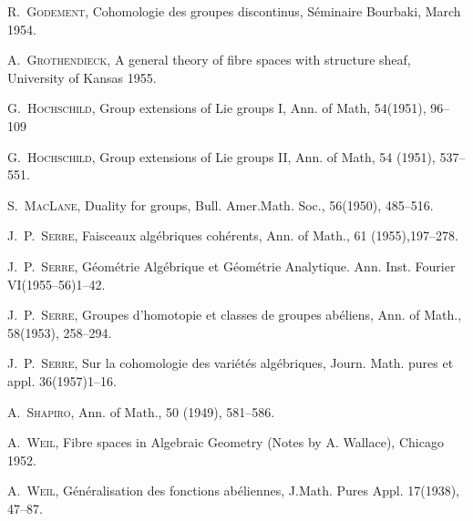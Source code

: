 \begin{list}{}
\item[{[10]}] R.\ \textsc{Godement}, Cohomologie des groupes discontinus,
Séminaire Bourbaki, March 1954.

\item[{[11]}] A.\ \textsc{Grothendieck}, A general theory of fibre spaces
with structure sheaf, University of Kansas 1955.

\item[{[12]}] G.\ \textsc{Hochschild}, Group extensions of Lie groups I,
Ann. of Math, 54(1951), 96--109

\item[{[13]}] G.\ \textsc{Hochschild}, Group extensions of Lie groups II,
Ann. of Math, 54 (1951), 537--551.

\item[{[14]}] S.\ \textsc{MacLane}, Duality for groups,
Bull. Amer.Math. Soc., 56(1950), 485--516.

\item[{[15]}] J.\ P.\ \textsc{Serre}, Faisceaux algébriques cohérents,
Ann. of Math., 61 (1955),197--278.

\item[{[16]}] J.\ P.\ \textsc{Serre}, Géométrie Algébrique et Géométrie
Analytique. Ann. Inst. Fourier VI(1955--56)1--42.

\item[{[17]}] J.\ P.\ \textsc{Serre}, Groupes d'homotopie et classes de groupes
abéliens, Ann. of Math., 58(1953), 258--294.

\item[{[18]}] J.\ P.\ \textsc{Serre}, Sur la cohomologie des variétés
algébriques, Journ. Math. pures et appl. 36(1957)\mbox{1--16}.

\item[{[19]}] A.\ \textsc{Shapiro}, Ann. of Math., 50 (1949), 581--586.

\item[{[20]}] A.\ \textsc{Weil}, Fibre spaces in Algebraic Geometry
(Notes by A. Wallace), Chicago 1952.

\item[{[21]}] A.\ \textsc{Weil}, Généralisation des fonctions abéliennes,
J.Math. Pures Appl. 17(1938), 47--87.
\end{list}
\normalsize

